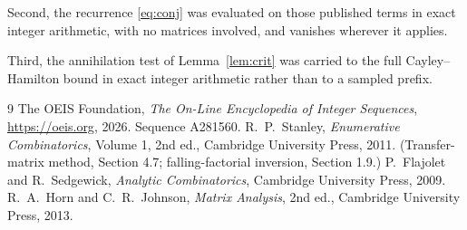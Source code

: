 \documentclass[11pt,a4paper]{article}
\theoremstyle{plain}
\theoremstyle{definition}
\begin{document}
Second, the recurrence \eqref{eq:conj} was evaluated on those published terms in exact
integer arithmetic, with no matrices involved, and vanishes wherever it applies.

Third, the annihilation test of Lemma~\ref{lem:crit} was carried to the full
Cayley--Hamilton bound in exact integer arithmetic rather than to a sampled prefix.

\begin{thebibliography}{9}
 The OEIS Foundation, \emph{The On-Line Encyclopedia of Integer
Sequences}, \url{https://oeis.org}, 2026. Sequence A281560.
 R.~P.~Stanley, \emph{Enumerative Combinatorics}, Volume 1, 2nd ed.,
Cambridge University Press, 2011. (Transfer-matrix method, Section 4.7; falling-factorial
inversion, Section 1.9.)
 P.~Flajolet and R.~Sedgewick, \emph{Analytic Combinatorics}, Cambridge
University Press, 2009.
 R.~A.~Horn and C.~R.~Johnson, \emph{Matrix Analysis}, 2nd ed., Cambridge
University Press, 2013.
\end{thebibliography}
\end{document}
